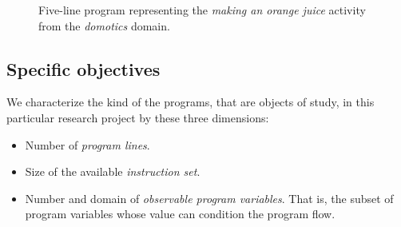 \documentclass[10pt,a4paper]{paper}
\begin{document}
\begin{itemize}
\begin{figure}[hbt!]
  \begin{center}
      \begin{scriptsize}   
     \end{scriptsize}            
\end{center}
\caption{\small Five-line program representing the {\em making an orange juice} activity from the {\em domotics} domain.}
\label{fig:activity}
\end{figure}
\end{itemize}



\subsection{Specific objectives}
\label{sec:objectivos}
We characterize the kind of the programs, that are objects of study, in this particular research project by these three dimensions:
\begin{itemize}
\item Number of {\em program lines}.
\item Size of the available {\em instruction set}.
\item Number and domain of {\em observable program variables}. That is, the subset of program variables whose value can condition the program flow.
\end{itemize}  
\end{document}
